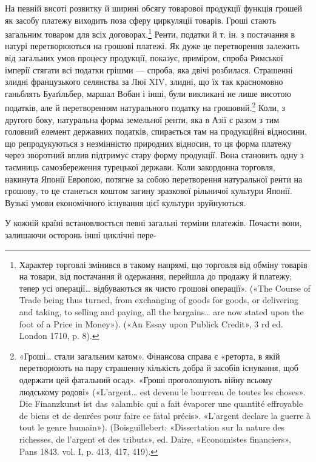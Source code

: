 На певній висоті розвитку й ширині обсягу товарової продукції функція грошей як засобу платежу
виходить поза сферу циркуляції товарів. Гроші стають загальним товаром для всіх
договорах.\footnote{
Характер торговлі змінився в такому напрямі, що торговля від
обміну товарів на товари, від постачання й одержання, перейшла до продажу
й платежу; тепер усі операції\dots{} відбуваються як чисто грошові
операції». («The Course of Trade being thus turned, from exchanging of
goods for goods, or delivering and taking, to selling and paying, all the
bargains\dots{} are now stated upon the foot of a Price in Money»). («An Essay
upon Publick Credit», 3 rd ed. London 1710, p. 8).
} Ренти, податки й т. ін. з постачання в натурі перетворюються
на грошові платежі. Як дуже це перетворення
залежить від загальних умов процесу продукції, показує, приміром,
спроба Римської імперії стягати всі податки грішми —
спроба, яка двічі розбилася. Страшенні злидні французького
селянства за Люї XIV, злидні, що їх так красномовно ганьблять
Буаґільбер, маршал Вобан і інші, були викликані не лише висотою
податків, але й перетворенням натурального податку на
грошовий.\footnote{
«Гроші\dots{} стали загальним катом». Фінансова справа є «реторта, в
якій перетворюють на пару страшенну кількість добра й засобів існування,
щоб одержати цей фатальний осад». «Гроші проголошують війну всьому
людському родові» («L’argent\dots{} est devenu le bourreau de toutes les choses».
Die Finanzkunst ist das «alambic qui a fait évaporer une quantité
effroyable de biens et de denrées pour faire ce fatal précis». «L’argent declare
la guerre à tout le genre humain»). (Boisguillebert: «Dissertation sur la
nature des richesses, de l’argent et des tributs», ed. Daire, «Economistes
financiers», Pans 1843. vol. I, p. 413, 417, 419).
} Коли, з другого боку, натуральна форма земельної
ренти, яка в Азії є разом з тим головний елемент державних
податків, спирається там на продукційні відносини, що репродукуються
з незмінністю природних відносин, то ця форма платежу
через зворотний вплив підтримує стару форму продукції. Вона
становить одну з таємниць самозбереження турецької держави.
Коли закордонна торговля, накинута Японії Европою, потягне
за собою перетворення натуральної ренти на грошову, то це
станеться коштом загину зразкової рільничої культури Японії.
Вузькі умови економічного існування цієї культури зруйнуються.

У кожній країні встановлюється певні загальні терміни платежів.
Почасти вони, залишаючи осторонь інші циклічні пере-


